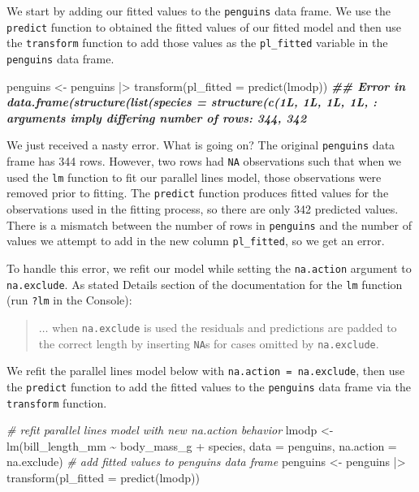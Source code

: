 \documentclass[
]{book}
\newenvironment{Shaded}{\begin{snugshade}}{\end{snugshade}}
\newcommand{\AttributeTok}[1]{\textcolor[rgb]{0.77,0.63,0.00}{#1}}
\newcommand{\CommentTok}[1]{\textcolor[rgb]{0.56,0.35,0.01}{\textit{#1}}}
\newcommand{\DocumentationTok}[1]{\textcolor[rgb]{0.56,0.35,0.01}{\textbf{\textit{#1}}}}
\newcommand{\FunctionTok}[1]{\textcolor[rgb]{0.00,0.00,0.00}{#1}}
\newcommand{\NormalTok}[1]{#1}
\newcommand{\OtherTok}[1]{\textcolor[rgb]{0.56,0.35,0.01}{#1}}
\newcommand{\SpecialCharTok}[1]{\textcolor[rgb]{0.00,0.00,0.00}{#1}}
\theoremstyle{definition}
\theoremstyle{definition}
\theoremstyle{definition}
\theoremstyle{definition}
\theoremstyle{remark}
\begin{document}
We start by adding our fitted values to the \texttt{penguins} data frame. We use the \texttt{predict} function to obtained the fitted values of our fitted model and then use the \texttt{transform} function to add those values as the \texttt{pl\_fitted} variable in the \texttt{penguins} data frame.

\begin{Shaded}
\begin{Highlighting}[]
\NormalTok{penguins }\OtherTok{\textless{}{-}}
\NormalTok{  penguins }\SpecialCharTok{|\textgreater{}}
  \FunctionTok{transform}\NormalTok{(}\AttributeTok{pl\_fitted =} \FunctionTok{predict}\NormalTok{(lmodp))}
\DocumentationTok{\#\# Error in data.frame(structure(list(species = structure(c(1L, 1L, 1L, 1L, : arguments imply differing number of rows: 344, 342}
\end{Highlighting}
\end{Shaded}

We just received a nasty error. What is going on? The original \texttt{penguins} data frame has 344 rows. However, two rows had \texttt{NA} observations such that when we used the \texttt{lm} function to fit our parallel lines model, those observations were removed prior to fitting. The \texttt{predict} function produces fitted values for the observations used in the fitting process, so there are only 342 predicted values. There is a mismatch between the number of rows in \texttt{penguins} and the number of values we attempt to add in the new column \texttt{pl\_fitted}, so we get an error.

To handle this error, we refit our model while setting the \texttt{na.action} argument to \texttt{na.exclude}. As stated Details section of the documentation for the \texttt{lm} function (run \texttt{?lm} in the Console):

\begin{quote}
\(\ldots\) when \texttt{na.exclude} is used the residuals and predictions are padded to the correct length by inserting \texttt{NA}s for cases omitted by \texttt{na.exclude}.
\end{quote}

We refit the parallel lines model below with \texttt{na.action\ =\ na.exclude}, then use the \texttt{predict} function to add the fitted values to the \texttt{penguins} data frame via the \texttt{transform} function.

\begin{Shaded}
\begin{Highlighting}[]
\CommentTok{\# refit parallel lines model with new na.action behavior}
\NormalTok{lmodp }\OtherTok{\textless{}{-}} \FunctionTok{lm}\NormalTok{(bill\_length\_mm }\SpecialCharTok{\textasciitilde{}}\NormalTok{ body\_mass\_g }\SpecialCharTok{+}\NormalTok{ species, }\AttributeTok{data =}\NormalTok{ penguins, }\AttributeTok{na.action =}\NormalTok{ na.exclude)}
\CommentTok{\# add fitted values to penguins data frame}
\NormalTok{penguins }\OtherTok{\textless{}{-}}
\NormalTok{  penguins }\SpecialCharTok{|\textgreater{}}
  \FunctionTok{transform}\NormalTok{(}\AttributeTok{pl\_fitted =} \FunctionTok{predict}\NormalTok{(lmodp))}
\end{Highlighting}
\end{Shaded}
\end{document}
